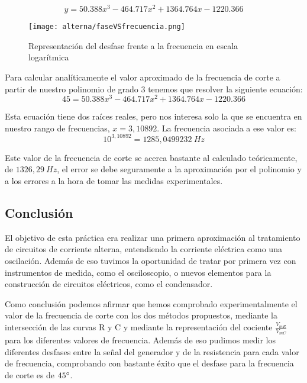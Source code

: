 \documentclass[a4paper,12pt,titlepage]{article}
\begin{document}
\begin{equation}
    y=50.388x^3-464.717x^2+1364.764x-1220.366
\end{equation}

\begin{figure}[h]
    \centering
    \texttt{[image: alterna/faseVSfrecuencia.png]}
    \caption{Representación del desfase frente a la frecuencia en escala logarítmica}
    \label{FaseVSfrecuencia}
\end{figure}

Para calcular analíticamente el valor aproximado de la frecuencia de corte a partir de nuestro polinomio de grado 3 tenemos que resolver la siguiente ecuación:
\begin{equation}
    45=50.388x^3-464.717x^2+1364.764x-1220.366
\end{equation}
\par Esta ecuación tiene dos raíces reales, pero nos interesa solo la que se encuentra en nuestro rango de frecuencias, $x=3,10892$. La frecuencia asociada a ese valor es:
\begin{equation}
    10^{3,10892}=1285,0499232\: Hz
\end{equation}
\par Este valor de la frecuencia de corte se acerca bastante al calculado teóricamente, de $1326,29 \:Hz$, el error se debe seguramente a la aproximación por el polinomio y a los errores a la hora de tomar las medidas experimentales.

\newpage

\subsection{Conclusión}
El objetivo de esta práctica era realizar una primera aproximación al tratamiento de circuitos de corriente alterna, entendiendo la corriente eléctrica como una oscilación. Además de eso tuvimos la oportunidad de tratar por primera vez con instrumentos de medida, como el osciloscopio, o nuevos elementos para la construcción de circuitos eléctricos, como el condensador.

\par Como conclusión podemos afirmar que hemos comprobado experimentalmente el valor de la frecuencia de corte con los dos métodos propuestos, mediante la intersección de las curvas R y C y mediante la representación del cociente $\frac{V_{mR}}{V_{mC}}$ para los diferentes valores de frecuencia. Además de eso pudimos medir los diferentes desfases entre la señal del generador y de la resistencia para cada valor de frecuencia, comprobando con bastante éxito que el desfase para la frecuencia de corte es de $45\degree$.
\end{document}
